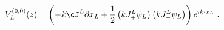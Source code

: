 \begin{equation}
V_L^{(0,0)}(z)=\left( -k\cJ^L\partial x_L+
{1\over 2}\left(kJ^L_+\psi_L\right)\left(kJ^L_-\psi_L\right)\right)
e^{ik\cdot x_L} \ .
\end{equation}

